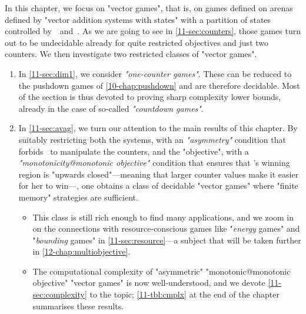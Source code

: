 In this chapter, we focus on "vector games", that is, on games defined
on arenas defined by "vector addition systems with states" with a
partition of states controlled by~\Eve\ and~\Adam.  As we are going to
see in \cref{11-sec:counters}, those games turn out to be undecidable
already for quite restricted objectives and just two counters.  We
then investigate two restricted classes of "vector games".
\begin{enumerate}
\item In \cref{11-sec:dim1}, we consider \emph{"one-counter games"}.  These can
  be reduced to the pushdown games of \cref{10-chap:pushdown} and are
  therefore decidable.  Most of the section is thus devoted to proving
  sharp complexity lower bounds, already in the case of so-called
  \emph{"countdown games"}.
\item In \cref{11-sec:avag}, we turn our attention to the main results of
  this chapter.  By suitably restricting both
  the systems, with an
  \emph{"asymmetry"} condition that forbids \Adam\ to manipulate the
  counters, and
  the "objective", with a \emph{"monotonicity@monotonic objective"}
    condition that ensures that \Eve's winning region is "upwards
    closed"---meaning that larger counter values make it easier for
    her to win---,
  one obtains a class of decidable "vector games" where "finite
  memory" strategies are sufficient.
  \begin{itemize}
  \item   This class is still rich enough to find many applications, and we
  zoom in on the connections with resource-conscious games like
  "\emph{energy} games" and "\emph{bounding} games" in
  \cref{11-sec:resource}---a subject that will be taken further in
  \cref{12-chap:multiobjective}.
  
  \item The computational complexity of "asymmetric" "monotonic@monotonic
  objective" "vector games" is now well-understood, and we devote
  \cref{11-sec:complexity} to the topic; \cref{11-tbl:cmplx} at the end of
  the chapter summarises these results.
  \end{itemize}
\end{enumerate}


\ifstandalone
{}
\tableofcontents
\fi

